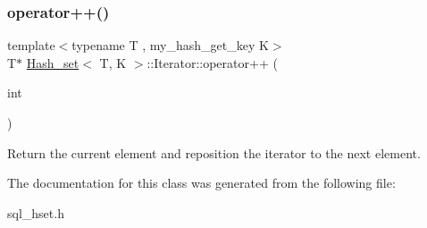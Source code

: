 \subsubsection{\texorpdfstring{operator++()}{operator++()}}
{\footnotesize\ttfamily template$<$typename T , my\+\_\+hash\+\_\+get\+\_\+key K$>$ \\
T$\ast$ \mbox{\hyperlink{classHash__set}{Hash\+\_\+set}}$<$ T, K $>$\+::Iterator\+::operator++ (\begin{DoxyParamCaption}\item[{int}]{ }\end{DoxyParamCaption})\hspace{0.3cm}{\ttfamily [inline]}}

Return the current element and reposition the iterator to the next element. 

The documentation for this class was generated from the following file\+:\begin{DoxyCompactItemize}
\item 
sql\+\_\+hset.\+h\end{DoxyCompactItemize}
